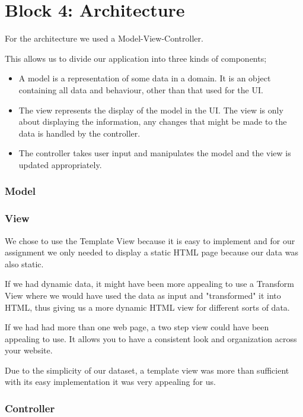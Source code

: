 \section*{Block 4: Architecture}

For the architecture we used a Model-View-Controller.

This allows us to divide our application into three kinds of components;

\begin{itemize}
\item A model is a representation of some data in a domain. It is an object containing all data and behaviour, other than that used for the UI. 
\item The view represents the display of the model in the UI. The view is only about displaying the information, any changes that might be made to the data is handled by the controller. 
\item The controller takes user input and manipulates the model and the view is updated appropriately. 
\end{itemize}

\subsubsection*{Model}

\subsubsection*{View}
We chose to use the Template View because it is easy to implement and for our assignment we only needed to display a static HTML page because our data was also static.

If we had dynamic data, it might have been more appealing to use a Transform View where we would have used the data as input and "transformed" it into HTML, thus giving us a more dynamic HTML view for different sorts of data.

If we had had more than one web page, a two step view could have been appealing to use. It allows you to have a consistent look and organization across your website. 

Due to the simplicity of our dataset, a template view was more than sufficient with its easy implementation it was very appealing for us. 

\subsubsection*{Controller}


